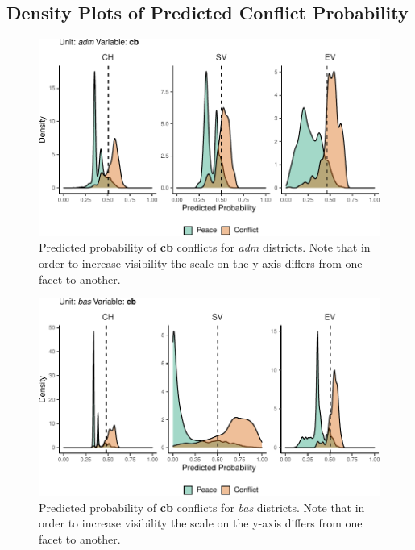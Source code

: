 \documentclass[a4paper,11pt]{article}
\begin{document}
\hypertarget{density-plots-of-predicted-conflict-probability}{%
\subsection*{Density Plots of Predicted Conflict Probability}\label{density-plots-of-predicted-conflict-probability}}
\begin{figure}[H]

{\centering \includegraphics{thesis_files/figure-latex/appendix-densities-1} 

}

\caption[Predicted probability of \textbf{cb} conflicts for \textit{adm} districts.]{Predicted probability of \textbf{cb} conflicts for \textit{adm} districts. Note that in order to increase visibility the scale on the y-axis differs from one facet to another.}\label{fig:appendix-densities-1}
\end{figure}
\begin{figure}[H]

{\centering \includegraphics{thesis_files/figure-latex/appendix-densities-2} 

}

\caption[Predicted probability of \textbf{cb} conflicts for \textit{bas} districts.]{Predicted probability of \textbf{cb} conflicts for \textit{bas} districts. Note that in order to increase visibility the scale on the y-axis differs from one facet to another.}\label{fig:appendix-densities-2}
\end{figure}
\end{document}
